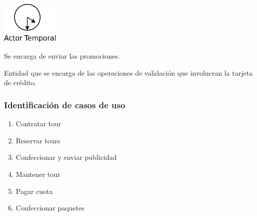 \documentclass[12pt,a4paper,titlepage,oneside]{article}
\begin{document}
\vspace*{1.5cm}

\begin{minipage}[b]{0.2\linewidth}\centering
	\includegraphics[height=2cm]{actor_temporal}
\end{minipage}
\begin{minipage}[b]{0.8\linewidth}\centering
	\begin{flushleft}
	Se encarga de enviar las promociones. \\
	\end{flushleft}
\end{minipage}

\vspace*{1.5cm}


\begin{minipage}[b]{0.8\linewidth}\centering
	\begin{flushleft}
Entidad que se encarga de las operaciones de validación que involucran la tarjeta de crédito. \\
	\end{flushleft}
\end{minipage}


\vspace*{1.5cm}



\newpage

\subsubsection{Identificación de casos de uso}

\begin{enumerate}
\item Contratar tour
\item Reservar tours
\item Confeccionar y enviar publicidad
\item Mantener tour
\item Pagar cuota
\item Confeccionar paquetes
\end{enumerate}
\end{document}
